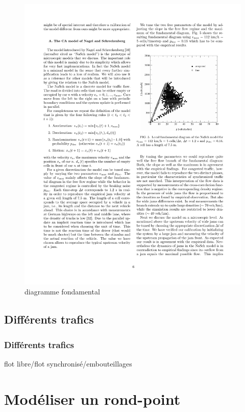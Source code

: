 \documentclass[slidetop,11pt]{beamer}
\begin{document}
\begin{frame}
	\begin{figure}
	\begin{center}
	\includegraphics[scale = 0.7]{diagramme-fondamental}
	\end{center}
	\caption{diagramme fondamental}
	\end{figure}

\end{frame}

	\subsection{Différents trafics}
\begin{frame}
	\frametitle{Différents trafics}
	flot libre/flot synchronisé/embouteillages
\end{frame}

\section{Modéliser un rond-point}
\end{document}

